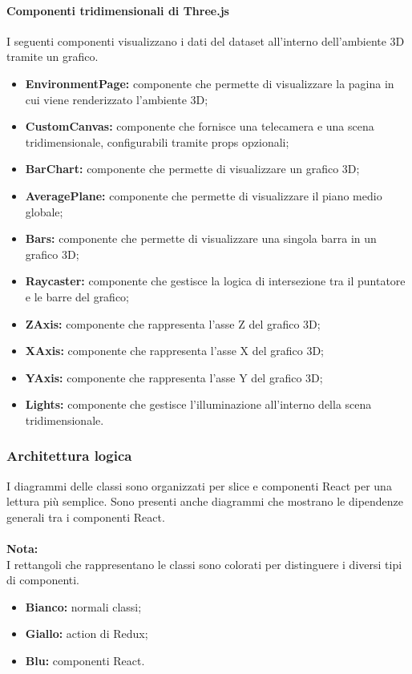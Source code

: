 \paragraph{Componenti tridimensionali di Three.js}
I seguenti componenti visualizzano i dati del dataset all'interno dell'ambiente
3D tramite un grafico.
\begin{itemize}
    \item \textbf{EnvironmentPage:} componente che permette di visualizzare la pagina in cui viene renderizzato l'ambiente 3D;
    \item \textbf{CustomCanvas:} componente che fornisce una telecamera e una scena tridimensionale, configurabili tramite props opzionali;
    \item \textbf{BarChart:} componente che permette di visualizzare un grafico 3D;
    \item \textbf{AveragePlane:} componente che permette di visualizzare il piano medio globale;
    \item \textbf{Bars:} componente che permette di visualizzare una singola barra in un grafico 3D;
    \item \textbf{Raycaster:} componente che gestisce la logica di intersezione tra il puntatore e le barre del grafico;
    \item \textbf{ZAxis:} componente che rappresenta l'asse Z del grafico 3D;
    \item \textbf{XAxis:} componente che rappresenta l'asse X del grafico 3D;
    \item \textbf{YAxis:} componente che rappresenta l'asse Y del grafico 3D;
    \item \textbf{Lights:} componente che gestisce l'illuminazione all'interno della scena tridimensionale.
\end{itemize}

\pagebreak

\subsubsection{Architettura logica}
I diagrammi delle classi sono organizzati per slice e componenti React per una
lettura più semplice. Sono presenti anche diagrammi che mostrano le dipendenze
generali tra i componenti React.\\\\ \textbf{Nota:}\\ I rettangoli che
rappresentano le classi sono colorati per distinguere i diversi tipi di
componenti.
\begin{itemize}
    \item \textbf{Bianco:} normali classi;
    \item \textbf{Giallo:} action di Redux;
    \item \textbf{Blu:} componenti React.
\end{itemize}

